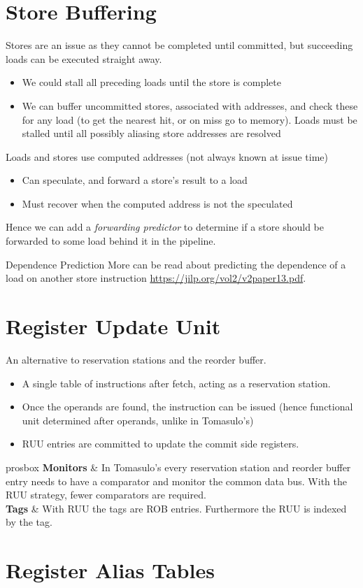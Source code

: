\section{Store Buffering}
Stores are an issue as they cannot be completed until committed, but succeeding loads can be executed straight away.
\begin{itemize}
	\item We could stall all preceding loads until the store is complete
	\item We can buffer uncommitted stores, associated with addresses, and check these for any load (to get the nearest hit, or on miss go to memory). Loads must be stalled until all possibly aliasing store addresses are resolved
\end{itemize}
Loads and stores use computed addresses (not always known at issue time)
\begin{itemize}
	\item Can speculate, and forward a store's result to a load
	\item Must recover when the computed address is not the speculated
\end{itemize}
Hence we can add a \textit{forwarding predictor} to determine if a store should be forwarded to some load behind it in the pipeline.
\begin{sidenotebox}{Dependence Prediction}
	More can be read about predicting the dependence of a load on another store instruction \href{here}{https://jilp.org/vol2/v2paper13.pdf}.
\end{sidenotebox}

\section{Register Update Unit}
An alternative to reservation stations and the reorder buffer.
\begin{itemize}
	\item A single table of instructions after fetch, acting as a reservation station.
	\item Once the operands are found, the instruction can be issued (hence functional unit determined after operands, unlike in Tomasulo's)
	\item RUU entries are committed to update the commit side registers.
\end{itemize}
\begin{tabbox}{prosbox}
	\textbf{Monitors} & In Tomasulo's every reservation station and reorder buffer entry needs to have a comparator and monitor the common data bus. With the RUU strategy, fewer comparators are required. \\
	\textbf{Tags} & With RUU the tags are ROB entries. Furthermore the RUU is indexed by the tag. \\
\end{tabbox}

\section{Register Alias Tables}
\unfinished
